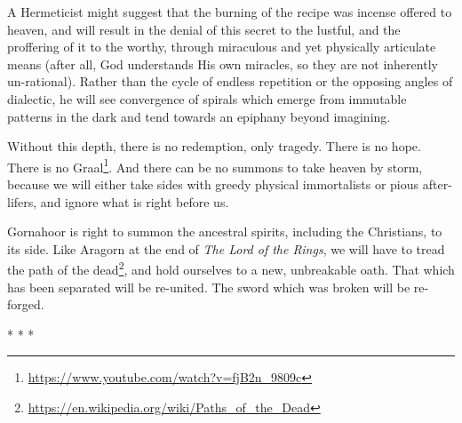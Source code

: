 A Hermeticist might suggest that the burning of the recipe was incense offered to heaven, and will result in the denial of this secret to the lustful, and the proffering of it to the worthy, through miraculous and yet physically articulate means (after all, God understands His own miracles, so they are not inherently un-rational). Rather than the cycle of endless repetition or the opposing angles of dialectic, he will see convergence of spirals which emerge from immutable patterns in the dark and tend towards an epiphany beyond imagining.

Without this depth, there is no redemption, only tragedy. There is no hope. There is no Graal\footnote{\url{https://www.youtube.com/watch?v=fjB2n\_9809c}}. And there can be no summons to take heaven by storm, because we will either take sides with greedy physical immortalists or pious after-lifers, and ignore what is right before us.

Gornahoor is right to summon the ancestral spirits, including the Christians, to its side. Like Aragorn at the end of \emph{The Lord of the Rings}, we will have to tread the path of the dead\footnote{\url{https://en.wikipedia.org/wiki/Paths\_of\_the\_Dead}}, and hold ourselves to a new, unbreakable oath. That which has been separated will be re-united. The sword which was broken will be re-forged.



\begin{center}* * *\end{center}

